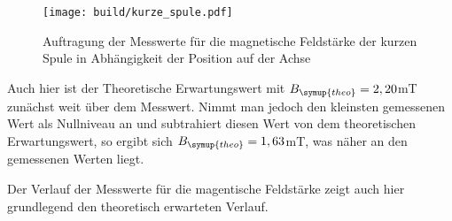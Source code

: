 \begin{figure}
  \centering
  \texttt{[image: build/kurze\_spule.pdf]}
  \caption{Auftragung der Messwerte für die magnetische Feldstärke der kurzen Spule
  in Abhängigkeit der Position auf der Achse}
  \label{fig:kurze_spule}
\end{figure}


Auch hier ist der Theoretische Erwartungswert mit $B_{\symup{theo}}=2,20$mT zunächst weit über dem Messwert. Nimmt man
jedoch den kleinsten gemessenen Wert als Nullniveau an und subtrahiert diesen Wert
von dem theoretischen Erwartungswert, so ergibt sich $B_{\symup{theo}}=1,63$mT, was näher
an den gemessenen Werten liegt.

Der Verlauf der Messwerte für die magentische Feldstärke zeigt auch hier grundlegend
den theoretisch erwarteten Verlauf.



